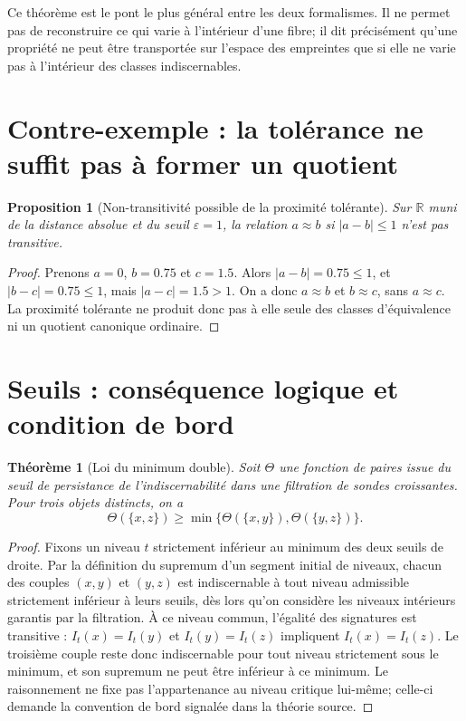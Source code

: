 \documentclass[11pt,a4paper,oneside]{report}
\newtheorem{proposition}{Proposition}[chapter]
\newtheorem{theorem}{Théorème}[chapter]
\newcommand{\R}{\mathbb R}
\begin{document}
Ce théorème est le pont le plus général entre les deux formalismes. Il ne permet pas de reconstruire ce qui varie à l'intérieur d'une fibre; il dit précisément qu'une propriété ne peut être transportée sur l'espace des empreintes que si elle ne varie pas à l'intérieur des classes indiscernables.

\section{Contre-exemple : la tolérance ne suffit pas à former un quotient}
\begin{proposition}[Non-transitivité possible de la proximité tolérante]
Sur \(\R\) muni de la distance absolue et du seuil \(\varepsilon=1\), la relation \(a\approx b\) si \(|a-b|\leq 1\) n'est pas transitive.
\end{proposition}
\begin{proof}
Prenons \(a=0\), \(b=0.75\) et \(c=1.5\). Alors \(|a-b|=0.75\leq1\), et \(|b-c|=0.75\leq1\), mais \(|a-c|=1.5>1\). On a donc \(a\approx b\) et \(b\approx c\), sans \(a\approx c\). La proximité tolérante ne produit donc pas à elle seule des classes d'équivalence ni un quotient canonique ordinaire.\end{proof}

\section{Seuils : conséquence logique et condition de bord}
\begin{theorem}[Loi du minimum double]
Soit \(\Theta\) une fonction de paires issue du seuil de persistance de l'indiscernabilité dans une filtration de sondes croissantes. Pour trois objets distincts, on a
\[
\Theta(\{x,z\})\geq\min\{\Theta(\{x,y\}),\Theta(\{y,z\})\}.
\]
\end{theorem}
\begin{proof}
Fixons un niveau \(t\) strictement inférieur au minimum des deux seuils de droite. Par la définition du supremum d'un segment initial de niveaux, chacun des couples \((x,y)\) et \((y,z)\) est indiscernable à tout niveau admissible strictement inférieur à leurs seuils, dès lors qu'on considère les niveaux intérieurs garantis par la filtration. À ce niveau commun, l'égalité des signatures est transitive : \(I_t(x)=I_t(y)\) et \(I_t(y)=I_t(z)\) impliquent \(I_t(x)=I_t(z)\). Le troisième couple reste donc indiscernable pour tout niveau strictement sous le minimum, et son supremum ne peut être inférieur à ce minimum. Le raisonnement ne fixe pas l'appartenance au niveau critique lui-même; celle-ci demande la convention de bord signalée dans la théorie source.\end{proof}
\end{document}
